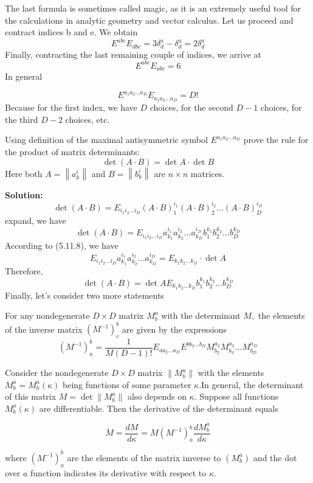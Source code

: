 The last formula is sometimes called magic, as it is an extremely useful tool for the calculations in analytic geometry and vector calculus. Let us proceed and contract indices b and e. We obtain
$$
E^{a b c} E_{d b c}=3 \delta_{d}^{a}-\delta_{d}^{a}=2 \delta_{d}^{a}
$$
Finally, contracting the last remaining couple of indices, we arrive at
$$
E^{a b c} E_{a b c}=6
$$
In general
\begin{qt}
\begin{equation}
E^{a_{1} a_{2} \ldots a_{D}} E_{a_{1} a_{2} \ldots a_{D}}=D !
\end{equation}
Because for the first index, we have $D$ choices, for the second $D-1$ choices, for the third $D-2$ choices, etc. 
\end{qt}
\begin{example}
Using definition of the maximal antisymmetric symbol $E^{a_{1} a_{2} \ldots a_{D}}$ prove the rule for the product of matrix determinants:
$$
\operatorname{det}(A \cdot B)=\operatorname{det} A \cdot \operatorname{det} B
$$
Here both $A=\left\|a_{k}^{i}\right\|$ and $B=\left\|b_{k}^{i}\right\|$ are $n \times n$ matrices.
\end{example}
\textbf{Solution:}
$$
\operatorname{det}(A \cdot B)=E_{i_{1} i_{2} \ldots i_{D}}(A \cdot B)_{1}^{i_{1}}(A \cdot B)_{2}^{i_{2}} \ldots(A \cdot B)_{D}^{i_{D}}
$$
expand, we have
$$
\operatorname{det}(A \cdot B)=E_{i_{1} i_{2} \ldots i_{D}} a_{k_{1}}^{i_{1}} a_{k_{2}}^{i_{2}} \ldots a_{k_{D}}^{i_{D}} b_{1}^{k_{1}} b_{2}^{k_{2}} \ldots b_{D}^{k_{D}}
$$
According to (5.11.8), we have
$$
E_{i_{1} i_{2} \ldots i_{D}} a_{k_{1}}^{i_{1}} a_{k_{2}}^{i_{2}} \ldots a_{k_{D}}^{i_{D}}=E_{k_{1} k_{2} \ldots k_{D}} \cdot \operatorname{det} A
$$
Therefore,
$$
\operatorname{det}(A \cdot B)=\operatorname{det} A E_{k_{1} k_{2} \ldots k_{D}} b_{1}^{k_{1}} b_{2}^{k_{2}} \ldots b_{D}^{k_{D}}
$$
Finally, let's consider two more statements
\begin{lemma}
For any nondegenerate $D \times D$ matrix $M_{b}^{a}$ with the determinant $M,$ the elements of the inverse matrix $\left(M^{-1}\right)_{c}^{b}$ are given by the expressions
\begin{equation}
\left(M^{-1}\right)_{a}^{b}=\frac{1}{M(D-1) !} E_{a a_{2} \ldots a_{D}} E^{b b_{2} \ldots b_{D}} M_{b_{2}}^{a_{2}} M_{b_{3}}^{a_{3}} \ldots M_{b_{D}}^{a_{D}}
\end{equation}
\end{lemma}
Consider the nondegenerate $D \times D$ matrix $\left\|M_{b}^{a}\right\|$ with the elements $M_{b}^{a}=M_{b}^{a}(\kappa)$ being functions of some parameter $\kappa .$In general, the determinant of this matrix $M=\operatorname{det}\left\|M_{b}^{a}\right\|$ also depends on $\kappa .$ Suppose all functions $M_{b}^{a}(\kappa)$ are differentiable. Then the derivative of the determinant equals
\begin{qt}
\begin{equation}
\dot{M}=\frac{d M}{d \kappa}=M\left(M^{-1}\right)_{a}^{b} \frac{d M_{b}^{a}}{d \kappa}
\end{equation}
\end{qt}
where $\left(M^{-1}\right)_{a}^{b}$ are the elements of the matrix imverse to $\left(M_{b}^{a}\right)$ and the dot over $a$ function indicates its derivative with respect to $\kappa$.

